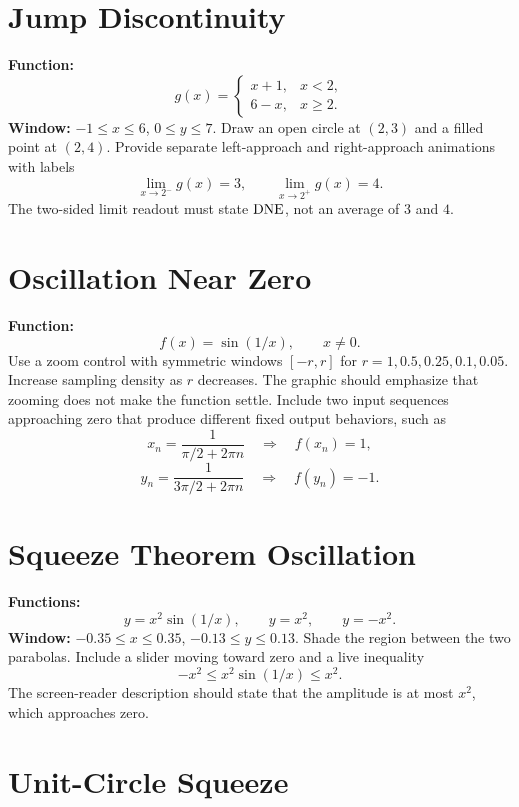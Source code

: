 \section{Jump Discontinuity}

\begin{bggraphspec}
\textbf{Function:}
\[
  g(x)=\begin{cases}x+1,&x<2,\\6-x,&x\ge2.\end{cases}
\]
\textbf{Window:} \(-1\le x\le6\), \(0\le y\le7\). Draw an open circle at \((2,3)\) and a filled point at \((2,4)\). Provide separate left-approach and right-approach animations with labels
\[
  \lim_{x\to2^-}g(x)=3,
  \qquad
  \lim_{x\to2^+}g(x)=4.
\]
The two-sided limit readout must state \(\mathrm{DNE}\), not an average of \(3\) and \(4\).
\end{bggraphspec}

\section{Oscillation Near Zero}

\begin{bggraphspec}
\textbf{Function:}
\[
  f(x)=\sin(1/x),\qquad x\ne0.
\]
Use a zoom control with symmetric windows \([-r,r]\) for \(r=1,0.5,0.25,0.1,0.05\). Increase sampling density as \(r\) decreases. The graphic should emphasize that zooming does not make the function settle. Include two input sequences approaching zero that produce different fixed output behaviors, such as
\[
  x_n=\frac{1}{\pi/2+2\pi n}\quad\Rightarrow\quad f(x_n)=1,
\]
\[
  y_n=\frac{1}{3\pi/2+2\pi n}\quad\Rightarrow\quad f(y_n)=-1.
\]
\end{bggraphspec}

\section{Squeeze Theorem Oscillation}

\begin{bggraphspec}
\textbf{Functions:}
\[
  y=x^2\sin(1/x),\qquad y=x^2,\qquad y=-x^2.
\]
\textbf{Window:} \(-0.35\le x\le0.35\), \(-0.13\le y\le0.13\). Shade the region between the two parabolas. Include a slider moving toward zero and a live inequality
\[
  -x^2\le x^2\sin(1/x)\le x^2.
\]
The screen-reader description should state that the amplitude is at most \(x^2\), which approaches zero.
\end{bggraphspec}

\section{Unit-Circle Squeeze}

